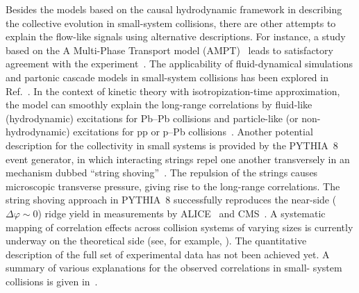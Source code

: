 Besides the models based on the causal hydrodynamic framework in describing the collective evolution in small-system collisions, there are other attempts to explain the flow-like signals using alternative descriptions. For instance, a study based on the A Multi-Phase Transport model (AMPT)~\cite{Lin:2004en} leads to satisfactory agreement with the experiment~\cite{OrjuelaKoop:2015jss}. The applicability of fluid-dynamical simulations and partonic cascade models in small-system collisions has been explored in Ref.~\cite{Gallmeister:2018mcn}. In the context of kinetic theory with isotropization-time approximation, the model can smoothly explain the long-range correlations by fluid-like (hydrodynamic) excitations for Pb--Pb collisions and particle-like (or non-hydrodynamic) excitations for pp or p--Pb collisions~\cite{Kurkela:2019kip,Kurkela:2020wwb,Ambrus:2021fej}. Another potential description for the collectivity in small systems is provided by the PYTHIA~8 event generator, in which interacting strings repel one another transversely in an mechanism dubbed ``string shoving''~\cite{Bierlich:2017vhg,Bierlich:2019ixq}. The repulsion of the strings causes microscopic transverse pressure, giving rise to the long-range correlations. The string shoving approach in PYTHIA~8 successfully reproduces the near-side ($\Delta\varphi\sim0$) ridge yield in measurements by ALICE~\cite{ALICE:2021nir} and CMS~\cite{Khachatryan:2016txc}. A systematic mapping of correlation effects across collision systems of varying sizes is currently underway on the theoretical side (see, for example, \cite{Schenke:2020mbo}). The quantitative description of the full set of experimental data has not been achieved yet. A summary of various explanations for the observed correlations in small- system collisions is given in~\cite{Strickland:2018exs,Loizides:2016tew,Nagle:2018nvi}. 


